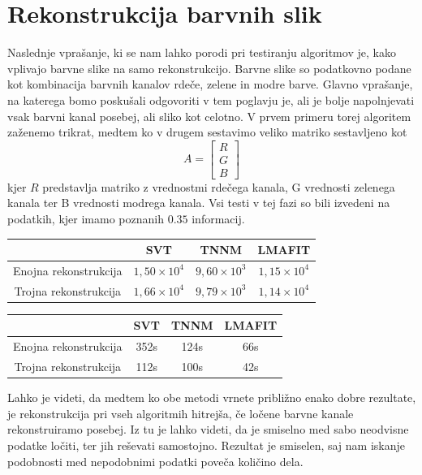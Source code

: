 \section{Rekonstrukcija barvnih slik}
Naslednje vprašanje, ki se nam lahko porodi pri testiranju algoritmov je, kako vplivajo barvne slike na samo rekonstrukcijo. Barvne slike so podatkovno podane kot kombinacija barvnih kanalov rdeče, zelene in modre barve. Glavno vprašanje, na katerega bomo poskušali odgovoriti v tem poglavju je, ali je bolje napolnjevati vsak barvni kanal posebej, ali sliko kot celotno. V prvem primeru torej algoritem zaženemo trikrat, medtem ko v drugem sestavimo veliko matriko sestavljeno kot 
\[
    A = \begin{bmatrix}
        R\\G\\B
    \end{bmatrix} 
\] 
kjer $R$ predstavlja matriko z vrednostmi rdečega kanala, G vrednosti zelenega kanala ter B vrednosti modrega kanala.
Vsi testi v tej fazi so bili izvedeni na podatkih, kjer imamo poznanih $0.35$ informacij.
\begin{table}[h]
    \centering
    \begin{tabular}{|c|c|c|c|}
    \hline
    & SVT & TNNM & LMAFIT \\
    \hline
    Enojna rekonstrukcija & $1,50 \times 10^4$ & $9,60\times 10^3$ & $1,15\times 10^4$ \\
    Trojna rekonstrukcija & $1,66\times 10^4$ & $9,79\times 10^3$ & $1,14\times 10^4$ \\
    \hline
    \end{tabular}
\end{table}

\begin{table}[h]
    \centering
    \begin{tabular}{|c|c|c|c|}
    \hline
    & SVT & TNNM & LMAFIT \\
    \hline
    Enojna rekonstrukcija & 352s & 124s & 66s \\
    Trojna rekonstrukcija & 112s & 100s & 42s \\
    \hline
    \end{tabular}
\end{table}
Lahko je videti, da medtem ko obe metodi vrnete približno enako dobre rezultate, je rekonstrukcija pri vseh algoritmih hitrejša, če ločene barvne kanale rekonstruiramo posebej. Iz tu je lahko videti, da je smiselno med sabo neodvisne podatke ločiti, ter jih reševati samostojno. Rezultat je smiselen, saj nam iskanje podobnosti med nepodobnimi podatki poveča količino dela. 
